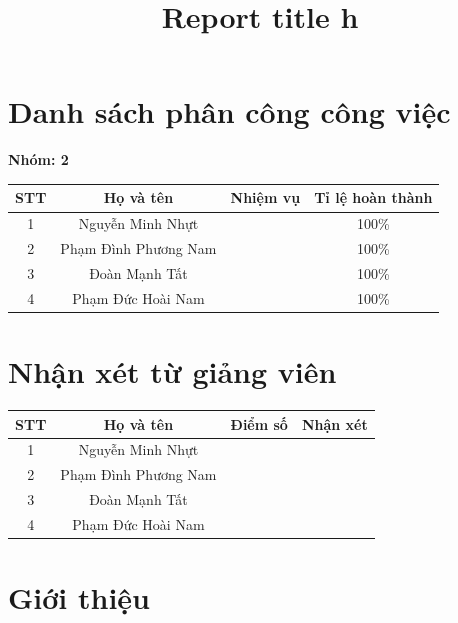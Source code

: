 \documentclass{latex/hcmut-report}
\title{Report title h}
\begin{document}
\coverpage

\section*{Danh sách phân công công việc}
\begin{center}
\textbf{Nhóm: 2} 

  \begin{tabular}{|c|c|c|c|}
    \hline
    \textbf{STT} & \textbf{Họ và tên} & \textbf{Nhiệm vụ} & \textbf{Tỉ lệ hoàn thành} \\
    \hline
    1 & Nguyễn Minh Nhựt  &  & 100\% \\  \hline
    2 & Phạm Đình Phương Nam &  & 100\% \\     \hline
    3 & Đoàn Mạnh Tất &   & 100\% \\       \hline
    4 & Phạm Đức Hoài Nam &   & 100\% \\ \hline 
  \end{tabular}
\end{center}

\section*{Nhận xét từ giảng viên}
\begin{center}
  \begin{tabular}{|c|c|c|c|}
    \hline
    \textbf{STT} & \textbf{Họ và tên} & \textbf{Điểm số} & \textbf{Nhận xét} \\
    \hline
    1 &  Nguyễn Minh Nhựt   & \hspace{1cm} & \hspace{7.5cm} \\    \hline
    2 & Phạm Đình Phương Nam &  &  \\     \hline
    3 & Đoàn Mạnh Tất  &  &  \\       \hline
    4 & Phạm Đức Hoài Nam  &  &  \\ \hline 

  \end{tabular}
\end{center}

\clearpage
{}
\tableofcontents
\clearpage
{}
\setcounter{page}{1}

\setcounter{section}{0}

\section{ Giới thiệu}
\end{document}
